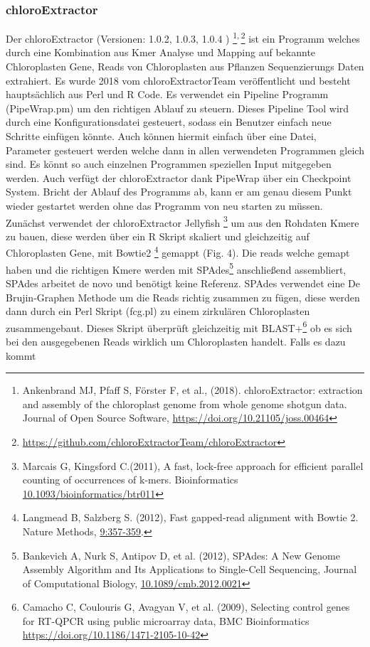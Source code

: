 \documentclass{scrartcl}
\begin{document}
\subsubsection{chloroExtractor}
\label{sec-2-5-1}
Der chloroExtractor (Versionen: 1.0.2, 1.0.3, 1.0.4 ) \footnote{Ankenbrand MJ, Pfaff S, Förster F, et al., (2018). chloroExtractor: extraction and assembly of the chloroplast genome from whole genome shotgun data. Journal of Open Source Software, \url{https://doi.org/10.21105/joss.00464}}\textsuperscript{,}\,\footnote{\url{https://github.com/chloroExtractorTeam/chloroExtractor}} ist ein Programm welches durch eine Kombination aus Kmer Analyse und Mapping auf bekannte Chloroplasten Gene, Reads von Chloroplasten aus Pflanzen Sequenzierungs Daten
extrahiert. Es wurde 2018 vom chloroExtractorTeam veröffentlicht \footnotemark[15]{} und besteht hauptsächlich aus Perl und R Code. Es verwendet ein Pipeline Programm (PipeWrap.pm) um den richtigen Ablauf zu steuern.
Dieses Pipeline Tool wird durch eine Konfigurationsdatei gesteuert, sodass ein Benutzer einfach neue Schritte einfügen könnte. Auch können hiermit einfach über eine Datei, Parameter gesteuert werden welche dann in 
allen verwendeten Programmen gleich sind. Es könnt so auch einzelnen Programmen speziellen Input mitgegeben werden. Auch verfügt der chloroExtractor dank PipeWrap über ein Checkpoint System. Bricht der Ablauf des Programms
ab, kann er am genau diesem Punkt wieder gestartet werden ohne das Programm von neu starten zu müssen. Zunächst verwendet der chloroExtractor Jellyfish \footnote{Marcais G, Kingsford C.(2011), A fast, lock-free approach for efficient parallel counting of occurrences of k-mers. Bioinformatics  \url{10.1093/bioinformatics/btr011}} um aus den Rohdaten Kmere zu bauen, diese werden über ein R
Skript skaliert und gleichzeitig auf Chloroplasten Gene, mit Bowtie2 \footnote{Langmead B, Salzberg S. (2012), Fast gapped-read alignment with Bowtie 2. Nature Methods, \url{9:357-359}.} gemappt (Fig. 4). Die reads welche gemapt haben und die richtigen Kmere werden mit SPAdes\footnote{Bankevich A, Nurk S, Antipov D, et al. (2012), SPAdes: A New Genome Assembly Algorithm and Its Applications to Single-Cell Sequencing, Journal of Computational Biology, \url{10.1089/cmb.2012.0021}} anschließend assembliert, SPAdes arbeitet de novo und benötigt
keine Referenz. SPAdes verwendet eine De Brujin-Graphen Methode um die Reads richtig zusammen zu fügen, diese werden dann durch ein Perl Skript (fcg.pl) zu einem zirkulären Chloroplasten zusammengebaut. Dieses Skript überprüft
gleichzeitig mit BLAST+\footnote{Camacho C, Coulouris G, Avagyan V, et al. (2009), Selecting control genes for RT-QPCR using public microarray data, BMC Bioinformatics \url{https://doi.org/10.1186/1471-2105-10-42}} ob es sich bei den ausgegebenen Reads wirklich um Chloroplasten handelt. Falls es dazu kommt
\end{document}
